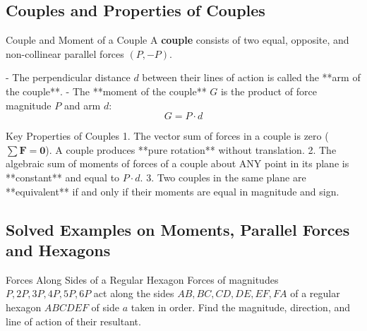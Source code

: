 \documentclass[11pt,a4paper]{article}
\begin{document}
\subsection{Couples and Properties of Couples}

\begin{definitionbox}{Couple and Moment of a Couple}
A \textbf{couple} consists of two equal, opposite, and non-collinear parallel forces $(P, -P)$.

- The perpendicular distance $d$ between their lines of action is called the **arm of the couple**.
- The **moment of the couple** $G$ is the product of force magnitude $P$ and arm $d$:
\begin{equation}
G = P \cdot d
\end{equation}
\end{definitionbox}

\begin{importantbox}{Key Properties of Couples}
1. The vector sum of forces in a couple is zero ($\sum \mathbf{F} = \mathbf{0}$). A couple produces **pure rotation** without translation.
2. The algebraic sum of moments of forces of a couple about ANY point in its plane is **constant** and equal to $P \cdot d$.
3. Two couples in the same plane are **equivalent** if and only if their moments are equal in magnitude and sign.
\end{importantbox}

\subsection{Solved Examples on Moments, Parallel Forces and Hexagons}

\begin{examplebox}{Forces Along Sides of a Regular Hexagon}
Forces of magnitudes $P, 2P, 3P, 4P, 5P, 6P$ act along the sides $AB, BC, CD, DE, EF, FA$ of a regular hexagon $ABCDEF$ of side $a$ taken in order. Find the magnitude, direction, and line of action of their resultant.
\end{examplebox}
\end{document}
